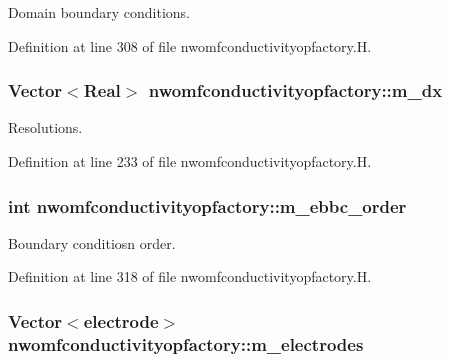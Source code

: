 Domain boundary conditions. 



Definition at line 308 of file nwomfconductivityopfactory.\+H.

\subsubsection[{\texorpdfstring{m\+\_\+dx}{m_dx}}]{\setlength{\rightskip}{0pt plus 5cm}Vector$<$Real$>$ nwomfconductivityopfactory\+::m\+\_\+dx\hspace{0.3cm}{\ttfamily [protected]}}\hypertarget{classnwomfconductivityopfactory_ac34b5ac6afcd62cb950c496d947a8fa4}{}\label{classnwomfconductivityopfactory_ac34b5ac6afcd62cb950c496d947a8fa4}


Resolutions. 



Definition at line 233 of file nwomfconductivityopfactory.\+H.

\subsubsection[{\texorpdfstring{m\+\_\+ebbc\+\_\+order}{m_ebbc_order}}]{\setlength{\rightskip}{0pt plus 5cm}int nwomfconductivityopfactory\+::m\+\_\+ebbc\+\_\+order\hspace{0.3cm}{\ttfamily [protected]}}\hypertarget{classnwomfconductivityopfactory_a57dd42d5d4d3902837cb51da94e5ac3a}{}\label{classnwomfconductivityopfactory_a57dd42d5d4d3902837cb51da94e5ac3a}


Boundary conditiosn order. 



Definition at line 318 of file nwomfconductivityopfactory.\+H.

\subsubsection[{\texorpdfstring{m\+\_\+electrodes}{m_electrodes}}]{\setlength{\rightskip}{0pt plus 5cm}Vector$<${\bf electrode}$>$ nwomfconductivityopfactory\+::m\+\_\+electrodes\hspace{0.3cm}{\ttfamily [protected]}}\hypertarget{classnwomfconductivityopfactory_a5be32bdb3baa52621b037d657ea5ab67}{}\label{classnwomfconductivityopfactory_a5be32bdb3baa52621b037d657ea5ab67}


